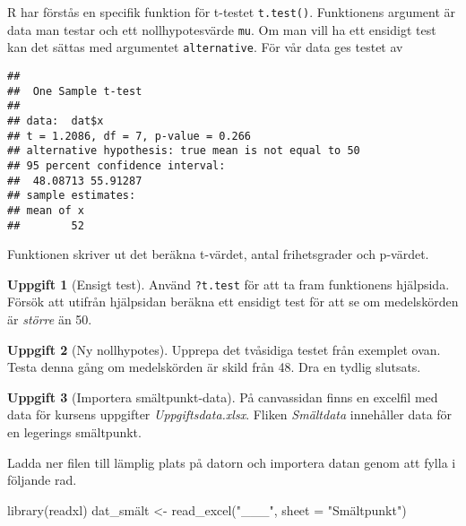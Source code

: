 \documentclass[
]{book}
\newenvironment{Shaded}{\begin{snugshade}}{\end{snugshade}}
\newcommand{\AttributeTok}[1]{\textcolor[rgb]{0.77,0.63,0.00}{#1}}
\newcommand{\CommentTok}[1]{\textcolor[rgb]{0.56,0.35,0.01}{\textit{#1}}}
\newcommand{\DecValTok}[1]{\textcolor[rgb]{0.00,0.00,0.81}{#1}}
\newcommand{\FunctionTok}[1]{\textcolor[rgb]{0.00,0.00,0.00}{#1}}
\newcommand{\NormalTok}[1]{#1}
\newcommand{\OtherTok}[1]{\textcolor[rgb]{0.56,0.35,0.01}{#1}}
\newcommand{\SpecialCharTok}[1]{\textcolor[rgb]{0.00,0.00,0.00}{#1}}
\newcommand{\StringTok}[1]{\textcolor[rgb]{0.31,0.60,0.02}{#1}}
\theoremstyle{definition}
\theoremstyle{definition}
\theoremstyle{definition}
\newtheorem{exercise}{Uppgift}[chapter]
\theoremstyle{definition}
\theoremstyle{remark}
\begin{document}
R har förstås en specifik funktion för t-testet \texttt{t.test()}. Funktionens argument är data man testar och ett nollhypotesvärde \texttt{mu}. Om man vill ha ett ensidigt test kan det sättas med argumentet \texttt{alternative}. För vår data ges testet av

\begin{Shaded}
\end{Shaded}

\begin{verbatim}
## 
##  One Sample t-test
## 
## data:  dat$x
## t = 1.2086, df = 7, p-value = 0.266
## alternative hypothesis: true mean is not equal to 50
## 95 percent confidence interval:
##  48.08713 55.91287
## sample estimates:
## mean of x 
##        52
\end{verbatim}

Funktionen skriver ut det beräkna t-värdet, antal frihetsgrader och p-värdet.

\begin{exercise}[Ensigt test]
Använd \texttt{?t.test} för att ta fram funktionens hjälpsida. Försök att utifrån hjälpsidan beräkna ett ensidigt test för att se om medelskörden är \emph{större} än 50.
\end{exercise}

\begin{exercise}[Ny nollhypotes]
Upprepa det tvåsidiga testet från exemplet ovan. Testa denna gång om medelskörden är skild från 48. Dra en tydlig slutsats.
\end{exercise}

\begin{exercise}[Importera smältpunkt-data]

På canvassidan finns en excelfil med data för kursens uppgifter \emph{Uppgiftsdata.xlsx}. Fliken \emph{Smältdata} innehåller data för en legerings smältpunkt.

Ladda ner filen till lämplig plats på datorn och importera datan genom att fylla i följande rad.

\begin{Shaded}
\begin{Highlighting}[]
\FunctionTok{library}\NormalTok{(readxl)}
\NormalTok{dat\_smält }\OtherTok{\textless{}{-}} \FunctionTok{read\_excel}\NormalTok{(}\StringTok{"\_\_\_"}\NormalTok{, }\AttributeTok{sheet =} \StringTok{"Smältpunkt"}\NormalTok{)}
\end{Highlighting}
\end{Shaded}

\end{exercise}
\end{document}
